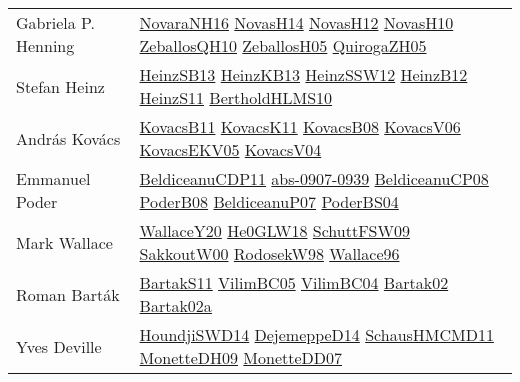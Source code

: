 {\begin{longtable}{p{4cm}p{20cm}}
Gabriela P. Henning & \href{articles/NovaraNH16.pdf}{NovaraNH16}\cite{NovaraNH16} \href{articles/NovasH14.pdf}{NovasH14}\cite{NovasH14} \href{articles/NovasH12.pdf}{NovasH12}\cite{NovasH12} \href{articles/NovasH10.pdf}{NovasH10}\cite{NovasH10} \href{articles/ZeballosQH10.pdf}{ZeballosQH10}\cite{ZeballosQH10} \href{articles/ZeballosH05.pdf}{ZeballosH05}\cite{ZeballosH05} \href{papers/QuirogaZH05.pdf}{QuirogaZH05}\cite{QuirogaZH05} \\
Stefan Heinz & \href{articles/HeinzSB13.pdf}{HeinzSB13}\cite{HeinzSB13} \href{papers/HeinzKB13.pdf}{HeinzKB13}\cite{HeinzKB13} \href{articles/HeinzSSW12.pdf}{HeinzSSW12}\cite{HeinzSSW12} \href{papers/HeinzB12.pdf}{HeinzB12}\cite{HeinzB12} \href{papers/HeinzS11.pdf}{HeinzS11}\cite{HeinzS11} \href{papers/BertholdHLMS10.pdf}{BertholdHLMS10}\cite{BertholdHLMS10} \\
Andr{\'{a}}s Kov{\'{a}}cs & \href{articles/KovacsB11.pdf}{KovacsB11}\cite{KovacsB11} \href{articles/KovacsK11.pdf}{KovacsK11}\cite{KovacsK11} \href{articles/KovacsB08.pdf}{KovacsB08}\cite{KovacsB08} \href{papers/KovacsV06.pdf}{KovacsV06}\cite{KovacsV06} \href{papers/KovacsEKV05.pdf}{KovacsEKV05}\cite{KovacsEKV05} \href{papers/KovacsV04.pdf}{KovacsV04}\cite{KovacsV04} \\
Emmanuel Poder & \href{articles/BeldiceanuCDP11.pdf}{BeldiceanuCDP11}\cite{BeldiceanuCDP11} \href{articles/abs-0907-0939.pdf}{abs-0907-0939}\cite{abs-0907-0939} \href{papers/BeldiceanuCP08.pdf}{BeldiceanuCP08}\cite{BeldiceanuCP08} \href{papers/PoderB08.pdf}{PoderB08}\cite{PoderB08} \href{papers/BeldiceanuP07.pdf}{BeldiceanuP07}\cite{BeldiceanuP07} \href{articles/PoderBS04.pdf}{PoderBS04}\cite{PoderBS04} \\
Mark Wallace & \href{articles/WallaceY20.pdf}{WallaceY20}\cite{WallaceY20} \href{papers/He0GLW18.pdf}{He0GLW18}\cite{He0GLW18} \href{papers/SchuttFSW09.pdf}{SchuttFSW09}\cite{SchuttFSW09} \href{articles/SakkoutW00.pdf}{SakkoutW00}\cite{SakkoutW00} \href{papers/RodosekW98.pdf}{RodosekW98}\cite{RodosekW98} \href{articles/Wallace96.pdf}{Wallace96}\cite{Wallace96} \\
Roman Bart{\'{a}}k & \href{articles/BartakS11.pdf}{BartakS11}\cite{BartakS11} \href{articles/VilimBC05.pdf}{VilimBC05}\cite{VilimBC05} \href{papers/VilimBC04.pdf}{VilimBC04}\cite{VilimBC04} \href{papers/Bartak02.pdf}{Bartak02}\cite{Bartak02} \href{papers/Bartak02a.pdf}{Bartak02a}\cite{Bartak02a} \\
Yves Deville & \href{papers/HoundjiSWD14.pdf}{HoundjiSWD14}\cite{HoundjiSWD14} \href{papers/DejemeppeD14.pdf}{DejemeppeD14}\cite{DejemeppeD14} \href{articles/SchausHMCMD11.pdf}{SchausHMCMD11}\cite{SchausHMCMD11} \href{papers/MonetteDH09.pdf}{MonetteDH09}\cite{MonetteDH09} \href{papers/MonetteDD07.pdf}{MonetteDD07}\cite{MonetteDD07} \\

\end{longtable}}

